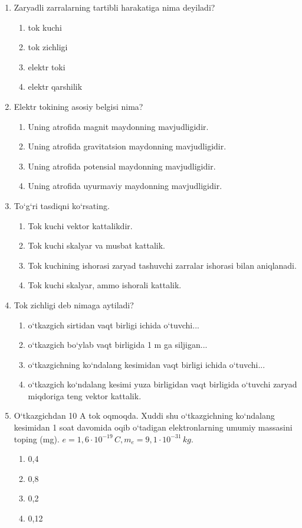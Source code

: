 \begin{enumerate}
\item Zaryadli zarralarning tartibli harakatiga nima deyiladi?
\begin{enumerate}[label=\Alph*)]
\item tok kuchi
\item tok zichligi
\item elektr toki
\item elektr qarshilik
\end{enumerate}

\item Elektr tokining asosiy belgisi nima?
\begin{enumerate}[label=\Alph*)]
\item Uning atrofida magnit maydonning mavjudligidir.
\item Uning atrofida gravitatsion maydonning mavjudligidir.
\item Uning atrofida potensial maydonning mavjudligidir.
\item Uning atrofida uyurmaviy maydonning mavjudligidir.
\end{enumerate}

\item To‘g‘ri tasdiqni ko‘rsating.
\begin{enumerate}[label=\Alph*)]
\item Tok kuchi vektor kattalikdir.
\item Tok kuchi skalyar va musbat kattalik.
\item Tok kuchining ishorasi zaryad tashuvchi zarralar ishorasi bilan aniqlanadi.
\item Tok kuchi skalyar, ammo ishorali kattalik.
\end{enumerate}

\item Tok zichligi deb nimaga aytiladi?
\begin{enumerate}[label=\Alph*)]
\item o‘tkazgich sirtidan vaqt birligi ichida o‘tuvchi...
\item o‘tkazgich bo‘ylab vaqt birligida 1 m ga siljigan...
\item o‘tkazgichning ko‘ndalang kesimidan vaqt birligi ichida o‘tuvchi...
\item o‘tkazgich ko‘ndalang kesimi yuza birligidan vaqt birligida o‘tuvchi zaryad miqdoriga teng vektor kattalik.
\end{enumerate}

\item O‘tkazgichdan 10 A tok oqmoqda. Xuddi shu o‘tkazgichning ko‘ndalang kesimidan 1 soat davomida oqib o‘tadigan elektronlarning umumiy massasini toping (mg). $e = 1,6 \cdot 10^{-19} \, C, m_e = 9,1 \cdot 10^{-31} \, kg$.
\begin{enumerate}[label=\Alph*)]
\item 0,4
\item 0,8
\item 0,2
\item 0,12
\end{enumerate}


\end{enumerate}
